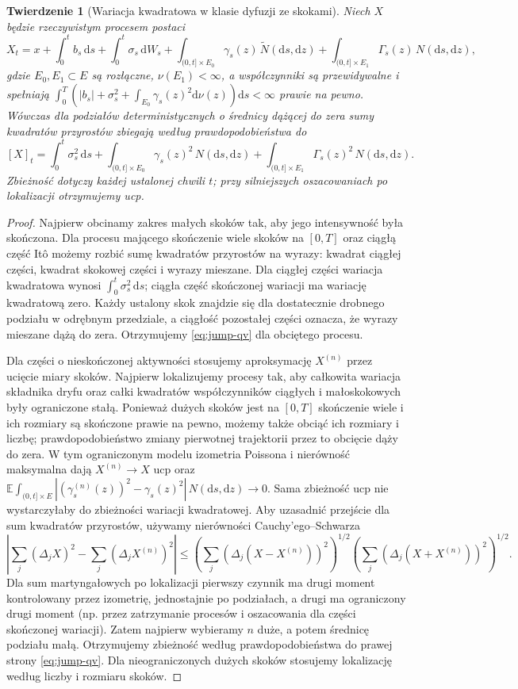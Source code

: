 \documentclass[11pt,a4paper,oneside]{report}
\numberwithin{equation}{chapter}
\theoremstyle{plain}
\newtheorem{twierdzenie}{Twierdzenie}[chapter]
\theoremstyle{definition}
\theoremstyle{remark}
\newcommand{\E}{\mathbb{E}}
\newcommand{\dd}{\mathrm{d}}
\begin{document}
\begin{twierdzenie}[Wariacja kwadratowa w klasie dyfuzji ze skokami]\label{thm:volIII:12:01}
\label{th:jump-qv}
Niech $X$ będzie rzeczywistym procesem postaci
\[
X_t=x+\int_0^t b_s\,\dd s+\int_0^t\sigma_s\,\dd W_s
+\int_{(0,t]\times E_0}\gamma_s(z)\,\widetilde N(\dd s,\dd z)
+\int_{(0,t]\times E_1}\Gamma_s(z)\,N(\dd s,\dd z),
\]
gdzie $E_0,E_1\subset E$ są rozłączne,
$\nu(E_1)<\infty$, a współczynniki są przewidywalne i spełniają
$\int_0^T(|b_s|+\sigma_s^2+\int_{E_0}\gamma_s(z)^2\dd\nu(z))\dd s
<\infty$ prawie na pewno.
Wówczas dla podziałów deterministycznych o średnicy dążącej
do zera sumy kwadratów przyrostów zbiegają według
prawdopodobieństwa do
\[
[X]_t=\int_0^t\sigma_s^2\,\dd s
+\int_{(0,t]\times E_0}\gamma_s(z)^2\,N(\dd s,\dd z)
+\int_{(0,t]\times E_1}\Gamma_s(z)^2\,N(\dd s,\dd z).
\tag{12.2}\label{eq:jump-qv}
\]
Zbieżność dotyczy każdej ustalonej chwili $t$; przy
silniejszych oszacowaniach po lokalizacji otrzymujemy ucp.
\end{twierdzenie}
\begin{proof}
Najpierw obcinamy zakres małych skoków tak, aby jego
intensywność była skończona. Dla procesu mającego
skończenie wiele skoków na $[0,T]$ oraz ciągłą część
Itô możemy rozbić sumę kwadratów przyrostów na
wyrazy: kwadrat ciągłej części, kwadrat skokowej
części i wyrazy mieszane. Dla ciągłej części
wariacja kwadratowa wynosi $\int_0^t\sigma_s^2\,\dd s$;
ciągła część skończonej wariacji ma wariację kwadratową
zero. Każdy ustalony skok znajdzie się dla dostatecznie
drobnego podziału w odrębnym przedziale, a ciągłość
pozostałej części oznacza, że wyrazy mieszane dążą do
zera. Otrzymujemy \eqref{eq:jump-qv} dla obciętego procesu.

Dla części o nieskończonej aktywności stosujemy
aproksymację $X^{(n)}$ przez ucięcie miary skoków.
Najpierw lokalizujemy procesy tak, aby całkowita wariacja
składnika dryfu oraz całki kwadratów współczynników
ciągłych i małoskokowych były ograniczone stałą. Ponieważ
dużych skoków jest na $[0,T]$ skończenie wiele i ich rozmiary
są skończone prawie na pewno, możemy także obciąć ich
rozmiary i liczbę; prawdopodobieństwo zmiany pierwotnej
trajektorii przez to obcięcie dąży do zera. W tym
ograniczonym modelu izometria Poissona i nierówność maksymalna
dają $X^{(n)}\to X$ ucp oraz
$\E\int_{(0,t]\times E}|(\gamma_s^{(n)}(z))^2-\gamma_s(z)^2|\,N(\dd s,\dd z)\to0$.
Sama zbieżność ucp nie wystarczyłaby do zbieżności wariacji
kwadratowej. Aby uzasadnić przejście dla sum kwadratów
przyrostów, używamy nierówności Cauchy'ego--Schwarza
\[
\left|\sum_j(\Delta_jX)^2-\sum_j(\Delta_jX^{(n)})^2\right|
\le\left(\sum_j(\Delta_j(X-X^{(n)}))^2\right)^{1/2}
\left(\sum_j(\Delta_j(X+X^{(n)}))^2\right)^{1/2}.
\]
Dla sum martyngałowych po lokalizacji pierwszy czynnik
ma drugi moment kontrolowany przez izometrię, jednostajnie
po podziałach, a drugi ma ograniczony drugi moment
(np. przez zatrzymanie procesów i oszacowania dla części
skończonej wariacji). Zatem najpierw wybieramy $n$ duże,
a potem średnicę podziału małą. Otrzymujemy zbieżność
według prawdopodobieństwa do prawej strony
\eqref{eq:jump-qv}. Dla nieograniczonych dużych skoków
stosujemy lokalizację według liczby i rozmiaru skoków.
\end{proof}
\end{document}

